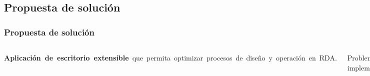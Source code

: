 \documentclass[9pt]{beamer}
\begin{document}
    \subsection{Propuesta de solución}
    \begin{frame}
        \frametitle{Propuesta de solución}
        
        \begin{columns}
           \textbf{Aplicación de escritorio extensible} que permita optimizar procesos de diseño y operación en RDA.\bigskip
    
            Problemas implementados:
            \bigskip
            \begin{itemize}  
                \justifying
                \item Problema de diseño de RDA basado en el costo de tuberías.
                \item Problema de operación basado en el Régimen de bombeo.
            \end{itemize}

            \begin{figure}
                \includegraphics[width=\textwidth]{assets/Relleno/Bombilla.png}
            \end{figure}
        \end{columns}

    \end{frame}
\end{document}
